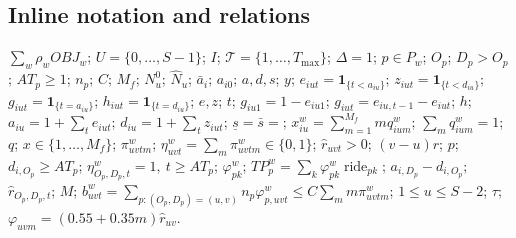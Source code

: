 \documentclass[10pt]{article}
\begin{document}
\subsection*{Inline notation and relations}
$\sum_w\rho_w OBJ_w$; $U=\{0,\ldots,S-1\}$; $I$; $\mathcal T=\{1,\ldots,T_{\max}\}$; $\Delta=1$; $p\in P_w$; $O_p$; $D_p>O_p$; $AT_p\ge1$; $n_p$; $C$; $M_f$; $N_u^0$; $\widehat N_u$; $\bar a_i$; $a_{i0}$; $a,d,s$; $y$; $e_{iut}=\mathbf1_{\{t<a_{iu}\}}$; $z_{iut}=\mathbf1_{\{t<d_{iu}\}}$; $g_{iut}=\mathbf1_{\{t=a_{iu}\}}$; $h_{iut}=\mathbf1_{\{t=d_{iu}\}}$; $e,z$; $t$; $g_{iu1}=1-e_{iu1}$; $g_{iut}=e_{iu,t-1}-e_{iut}$; $h$; $a_{iu}=1+\sum_te_{iut}$; $d_{iu}=1+\sum_tz_{iut}$; $\underline s=\bar s=$; $x_{iu}^w=\sum_{m=1}^{M_f}m q_{ium}^w$; $\sum_mq_{ium}^w=1$; $q$; $x\in\{1,\ldots,M_f\}$; $\pi_{uvtm}^w$; $\eta_{uvt}^w=\sum_m\pi_{uvtm}^w\in\{0,1\}$; $\widehat r_{uvt}>0$; $(v-u)r$; $p$; $d_{i,O_p}\ge AT_p$; $\eta_{O_p,D_p,t}^w=1,\ t\ge AT_p$; $\varphi_{pk}^w$; $TP_p^w=\sum_k\varphi_{pk}^w\operatorname{ride}_{pk}$; $a_{i,D_p}-d_{i,O_p}$; $\widehat r_{O_p,D_p,t}$; $M$; $b^w_{uvt}=\sum_{p:(O_p,D_p)=(u,v)}n_p\varphi^w_{p,uvt}
\le C\sum_m m\pi^w_{uvtm}$; $1\le u\le S-2$; $\tau$; $\varphi_{uvm}=(0.55+0.35m)\widehat r_{uv}$.
\end{document}
